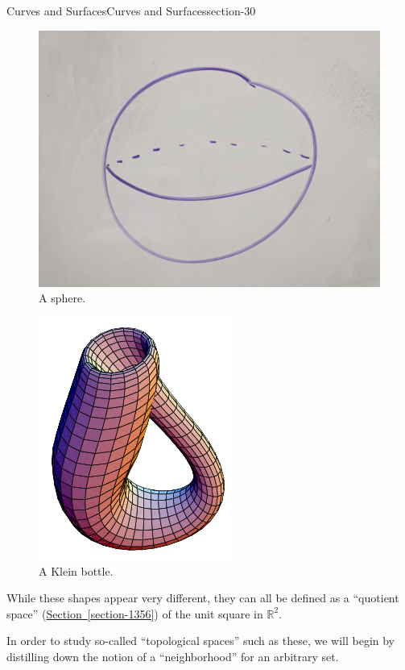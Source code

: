 \documentclass[oneside,10pt,]{article}
\begin{document}
\begin{sectionptx}{Curves and Surfaces}{}{Curves and Surfaces}{}{}{section-30}
\begin{figure}
\includegraphics[width=1\linewidth]{images/sphere.jpg}
\caption{A sphere.\label{figure-116}}
\end{figure}
\begin{figure}
\centering
\includegraphics[width=1\linewidth]{images/klein-bottle.png}
\caption{A Klein bottle.\label{figure-119}}
\end{figure}
\hypertarget{p-122}{}%
While these shapes appear very different, they can all be defined as a ``quotient space'' (\hyperref[section-1356]{Section~\ref{section-1356}}) of the unit square in \(\mathbb R^2\).%
\par
\hypertarget{p-126}{}%
In order to study so-called ``topological spaces'' such as these, we will begin by distilling down the notion of a ``neighborhood'' for an arbitrary set.%
\end{sectionptx}
\end{document}
